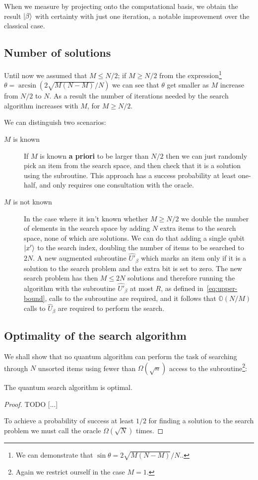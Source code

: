 When we measure by projecting onto the computational basis, we obtain the result $\ket{\beta}$ with certainty with just one iteration, a notable improvement over the classical case.

\subsection{Number of solutions}\label{sec:M}
Until now we assumed that $M\leq N/2$; if $M \geq N/2$ from the expression\footnote{We can demonstrate that $\sin\theta = 2\sqrt{M(N-M)}/N$..} $\theta=\arcsin(2\sqrt{M(N-M)}/N)$ we can see that $\theta$ get smaller as $M$ increase from $N/2$ to $N$. As a result the number of iterations needed by the search algorithm increases with $M$, for $M\geq N/2$.

We can distinguish two scenarios:
\begin{description}
   \item[$M$ is known] If $M$ is known \textbf{a priori} to be larger than $N/2$ then we can just randomly pick an item from the search space, and then check that it is a solution using the subroutine. This approach has a success probability at least one-half, and only requires one consultation with the oracle.
   \item[$M$ is not known] In the case where it isn't known whether $M\geq N/2$ we double the number of elements in the search space by adding $N$ extra items to the search space, none of which are solutions. We can do that adding a single qubit $\ket{x'}$ to the search index, doubling the number of items to be searched to $2N$. A new augmented subroutine $\hat{U'}_\beta$ which marks an item only if it is a solution to the search problem and the extra bit is set to zero. The new search problem has then $M \leq 2N$ solutions and therefore running the algorithm with the subroutine $\hat{U'}_\beta$ at most $R$, as defined in~\ref{eq:upper-bound}, calls to the subroutine are required, and it follows that $\mathbb{O}(N/M)$ calls to $\hat{U}_\beta$ are required to perform the search.
\end{description}
\subsection{Optimality of the search algorithm}
We shall show that no quantum algorithm can perform the task of searching through $N$ unsorted items using fewer than $\Omega(\sqrt{n})$ access to the subroutine\footnote{Again we restrict ourself in the case $M=1$.}:
\begin{theorem}
The quantum search algorithm is optimal. 
\end{theorem}
\begin{proof}
TODO [...]

To achieve a probability of success at least $1/2$ for finding a solution to the search problem we must call the oracle $\Omega(\sqrt{N})$ times.
\end{proof}

